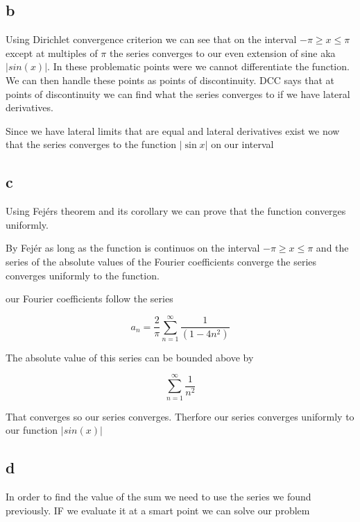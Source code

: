 \documentclass[a4paper]{article}
\begin{document}
\subsection*{b}

Using Dirichlet convergence criterion we can see that on the interval $-\pi \ge x \le \pi$ except at multiples of $\pi$ the series converges to our even extension of sine aka $|sin(x)|$. In these problematic points were we cannot differentiate the function. We can then handle these points as points of discontinuity. DCC says that at points of discontinuity we can find what the series converges to if we have lateral derivatives.

Since we have lateral limits that are equal and lateral derivatives exist we now that the series converges to the function $|\sin{x}|$ on our interval

\subsection*{c}

Using Fejérs theorem and its corollary we can prove that the function converges uniformly. 

By Fejér as long as the function is continuos on the interval $-\pi \ge x \le \pi$ and the series of  the absolute values of the Fourier coefficients converge the series converges uniformly to the function.

our Fourier coefficients follow the series

\begin{equation}
    a_n = \frac{2}{\pi} \sum_{n=1}^\infty \frac{1}{(1-4n^2)}
\end{equation}

The absolute value of this series can be bounded above by 

\begin{equation}
    \sum_{n=1}^\infty \frac{1}{n^2}
\end{equation}

That converges so our series converges. Therfore our series converges uniformly to our function $|sin(x)|$

\subsection*{d}

In order to find the value of the sum we need to use the series we found previously. IF we evaluate it at a smart point we can solve our problem
\end{document}
